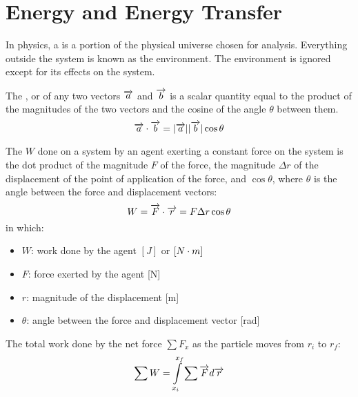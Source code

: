 \chapter{Energy and Energy Transfer}
        \par In physics, a  is a portion of the physical universe chosen for
        analysis. Everything outside the system is known as the environment. The environment
        is ignored except for its effects on the system.

        \par The , or  of any two vectors $\overrightarrow{a}$ and
        $\overrightarrow{b}$ is a scalar quantity equal to the product of the magnitudes of the two vectors
        and the cosine of the angle $\theta$ between them.
        \begin{equation*}
            \overrightarrow{a} \cdot \overrightarrow{b} = |\overrightarrow{a}||\overrightarrow{b}|\cos \theta
        \end{equation*}

        \par The  $W$ done on a system by an agent exerting a constant force on the system
        is the dot product of the magnitude $F$ of the force, the magnitude $\Delta r$ of the
        displacement of the point of application of the force, and $\cos \theta$, where $\theta$ is
        the angle between the force and displacement vectors:
        \begin{equation}
            W = \overrightarrow{F} \cdot \overrightarrow{r} = F \Delta r \cos \theta
        \end{equation}
        in which:
        \begin{itemize}
            \item $W$: work done by the agent $[J]$ or $[N \cdot m]$
            \item $F$: force exerted by the agent [N]
            \item $r$: magnitude of the displacement [m]
            \item $\theta$: angle between the force and displacement vector [rad]
        \end{itemize}

        \par The total work done by the net force $ \sum F_{x}$ as the particle moves from $r_{i}$
        to $r_{f}$:
        \begin{equation} \label{eq:work01}
            \sum W = {\int\limits _{x_{i}}^{x_{f}} \sum \overrightarrow{F}d\overrightarrow{r}}
        \end{equation}

